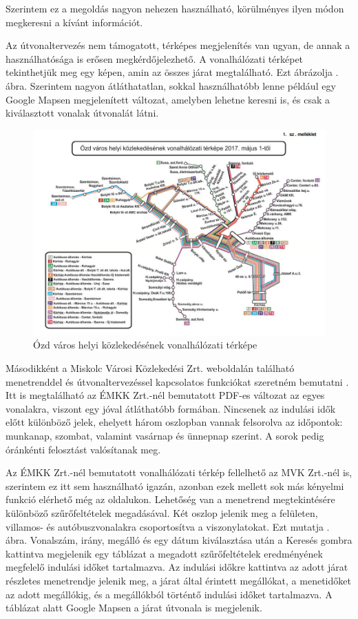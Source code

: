 Szerintem ez a megoldás nagyon nehezen használható, körülményes ilyen módon megkeresni a kívánt információt.

Az útvonaltervezés nem támogatott, térképes megjelenítés van ugyan, de annak a használhatósága is erősen megkérdőjelezhető. A vonalhálózati térképet tekinthetjük meg egy képen, amin az összes járat megtalálható. Ezt ábrázolja . ábra. Szerintem nagyon átláthatatlan, sokkal használhatóbb lenne például egy Google Mapsen megjelenített változat, amelyben lehetne keresni is, és csak a kiválasztott vonalak útvonalát látni.

\begin{figure}[h!]
\centering
\includegraphics[scale=0.6]{kepek/EMKK_vonalhalozat.jpg}
\caption{Ózd város helyi közlekedésének vonalhálózati térképe}
\label{fig:EMKK_vonalhalozat}
\end{figure}

Másodikként a Miskolc Városi Közlekedési Zrt. weboldalán található menetrenddel és útvonaltervezéssel kapcsolatos funkciókat szeretném bemutatni \cite{mvk}. Itt is megtalálható az ÉMKK Zrt.-nél bemutatott PDF-es változat az egyes vonalakra, viszont egy jóval átláthatóbb formában. Nincsenek az indulási idők előtt különböző jelek, ehelyett három oszlopban vannak felsorolva az időpontok: munkanap, szombat, valamint vasárnap és ünnepnap szerint. A sorok pedig óránkénti felosztást valósítanak meg.

Az ÉMKK Zrt.-nél bemutatott vonalhálózati térkép fellelhető az MVK Zrt.-nél is, szerintem ez itt sem használható igazán, azonban ezek mellett sok más kényelmi funkció elérhető még az oldalukon. Lehetőség van a menetrend megtekintésére különböző szűrőfeltételek megadásával. Két oszlop jelenik meg a felületen, villamos- és autóbuszvonalakra csoportosítva a viszonylatokat. Ezt mutatja . ábra. Vonalszám, irány, megálló és egy dátum kiválasztása után a Keresés gombra kattintva megjelenik egy táblázat a megadott szűrőfeltételek eredményének megfelelő indulási időket tartalmazva. Az indulási időkre kattintva az adott járat részletes menetrendje jelenik meg, a járat által érintett megállókat, a menetidőket az adott megállókig, és a megállókból történtő indulási időket tartalmazva. A táblázat alatt Google Mapsen a járat útvonala is megjelenik.

